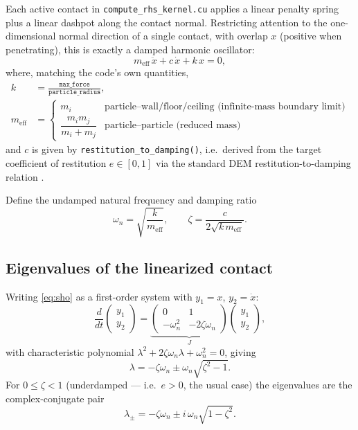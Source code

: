 \documentclass[11pt]{article}
\begin{document}
Each active contact in \texttt{compute\_rhs\_kernel.cu} applies a linear penalty spring
plus a linear dashpot along the contact normal. Restricting attention to the
one-dimensional normal direction of a single contact, with overlap $x$ (positive when
penetrating), this is exactly a damped harmonic oscillator:
\begin{equation}
  m_{\text{eff}}\, \ddot x + c\, \dot x + k\, x = 0,
  \label{eq:sho}
\end{equation}
where, matching the code's own quantities,
\begin{align}
  k &= \frac{\texttt{max\_force}}{\texttt{particle\_radius}}, \\
  m_{\text{eff}} &= \begin{cases}
    m_i & \text{particle--wall/floor/ceiling (infinite-mass boundary limit)} \\
    \dfrac{m_i m_j}{m_i + m_j} & \text{particle--particle (reduced mass)}
  \end{cases}
\end{align}
and $c$ is given by \texttt{restitution\_to\_damping()}, i.e.\ derived from the target
coefficient of restitution $e \in [0,1]$ via the standard DEM restitution-to-damping
relation \cite{tsuji1992,direnzodimaio2004}.

Define the undamped natural frequency and damping ratio
\begin{equation}
  \omega_n = \sqrt{\frac{k}{m_{\text{eff}}}}, \qquad
  \zeta = \frac{c}{2\sqrt{k\, m_{\text{eff}}}}.
\end{equation}

\subsection{Eigenvalues of the linearized contact}

Writing \eqref{eq:sho} as a first-order system with $y_1 = x$, $y_2 = \dot x$:
\begin{equation}
  \frac{d}{dt}\begin{pmatrix} y_1 \\ y_2 \end{pmatrix}
  = \underbrace{\begin{pmatrix} 0 & 1 \\ -\omega_n^2 & -2\zeta\omega_n \end{pmatrix}}_{J}
  \begin{pmatrix} y_1 \\ y_2 \end{pmatrix},
\end{equation}
with characteristic polynomial $\lambda^2 + 2\zeta\omega_n \lambda + \omega_n^2 = 0$, giving
\begin{equation}
  \lambda = -\zeta\omega_n \pm \omega_n\sqrt{\zeta^2 - 1}.
  \label{eq:eigs}
\end{equation}
For $0 \le \zeta < 1$ (underdamped — i.e.\ $e > 0$, the usual case) the eigenvalues are the
complex-conjugate pair
\begin{equation}
  \lambda_{\pm} = -\zeta\omega_n \pm i\,\omega_n\sqrt{1-\zeta^2}.
  \label{eq:eigs-complex}
\end{equation}
\end{document}
